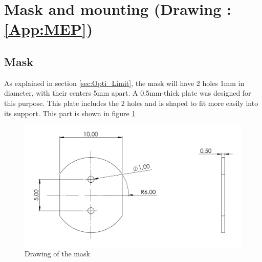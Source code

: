 \section{Mask and mounting (Drawing : \ref{App:MEP})}\label{sec:mask}
\subsection{Mask}
As explained in section \ref{sec:Opti_Limit}, the mask will have 2 holes 1mm in diameter, with their centers 5mm apart. 
A 0.5mm-thick plate was designed for this purpose. This plate includes the 2 holes and is shaped to fit more easily into its support.
This part is shown in figure \ref{fig:Mec_Mask}
\begin{figure}[H]
    \centering
    \includegraphics[scale=0.6]{assets/figures/Mechanical Design/Dessin_Mask.png}
    \caption{Drawing of the mask}
    \label{fig:Mec_Mask}
\end{figure}
